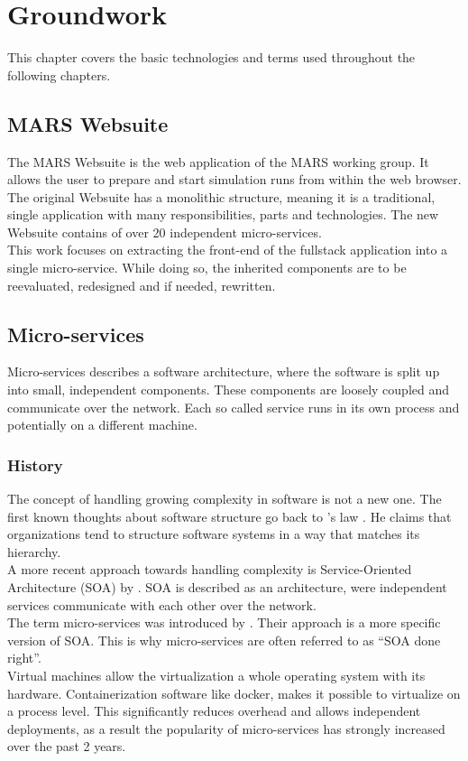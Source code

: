 
\chapter{Groundwork}
This chapter covers the basic technologies and terms used throughout the following chapters.



\section{MARS Websuite}
The MARS Websuite is the web application of the MARS working group. It allows the user to prepare and start simulation runs from within the web browser.\\
The original Websuite has a monolithic structure, meaning it is a traditional, single application with many responsibilities, parts and technologies. The new Websuite contains of over 20 independent micro-services.\\
This work focuses on extracting the front-end of the fullstack application into a single micro-service. While doing so, the inherited components are to be reevaluated, redesigned and if needed, rewritten.



\section{Micro-services}
\label{sec:micro-services}
Micro-services describes a software architecture, where the software is split up into small, independent components. These components are loosely coupled and communicate over the network. Each so called service runs in its own process and potentially on a different machine.


\subsection{History}
The concept of handling growing complexity in software is not a new one. The first known thoughts about software structure go back to \citeauthor{conway1968committees}'s law \citeyearpar{conway1968committees}. He claims that organizations tend to structure software systems in a way that matches its hierarchy.\\
A more recent approach towards handling complexity is Service-Oriented Architecture (SOA) by \cite{as2005service}. SOA is described as an architecture, were independent services communicate with each other over the network.\\
The term micro-services was introduced by \cite{martinfowler2014microservices}. Their approach is a more specific version of SOA. This is why micro-services are often referred to as \enquote{SOA done right}.\\
Virtual machines allow the virtualization a whole operating system with its hardware. Containerization software like docker, makes it possible to virtualize on a process level. This significantly reduces overhead and allows independent deployments, as a result the popularity of micro-services has strongly increased over the past 2 years.


